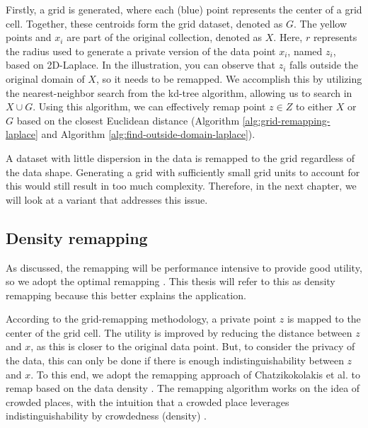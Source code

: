 Firstly, a grid is generated, where each (blue) point represents the center of a grid cell.
Together, these centroids form the grid dataset, denoted as $G$.
The yellow points and $x_i$ are part of the original collection, denoted as $X$.
Here, $r$ represents the radius used to generate a private version of the data point $x_i$, named $z_i$, based on 2D-Laplace.
In the illustration, you can observe that $z_i$ falls outside the original domain of $X$, so it needs to be remapped.
We accomplish this by utilizing the nearest-neighbor search from the kd-tree algorithm, allowing us to search in $X \cup G$.
Using this algorithm, we can effectively remap point $z \in Z$ to either $X$ or $G$ based on the closest Euclidean distance (Algorithm \ref{alg:grid-remapping-laplace} and Algorithm \ref{alg:find-outside-domain-laplace}).

A dataset with little dispersion in the data is remapped to the grid regardless of the data shape. 
Generating a grid with sufficiently small grid units to account for this would still result in too much complexity. 
Therefore, in the next chapter, we will look at a variant that addresses this issue.



\newpage
\subsection{Density remapping} \label{theory:optimal-remapping}
As discussed, the remapping will be performance intensive to provide good utility, so we adopt the optimal remapping \citep{chatzikokolakis_efficient_2017}.
This thesis will refer to this as density remapping because this better explains the application.

According to the grid-remapping methodology, a private point $z$ is mapped to the center of the grid cell.
The utility is improved by reducing the distance between $z$ and $x$, as this is closer to the original data point.
But, to consider the privacy of the data, this can only be done if there is enough indistinguishability between $z$ and $x$.
To this end, we adopt the remapping approach of Chatzikokolakis et al. to remap based on the data density \citep{chatzikokolakis_efficient_2017}.
The remapping algorithm works on the idea of crowded places, with the intuition that a crowded place leverages indistinguishability by crowdedness (density) \citep{chatzikokolakis_efficient_2017}.  \newline

